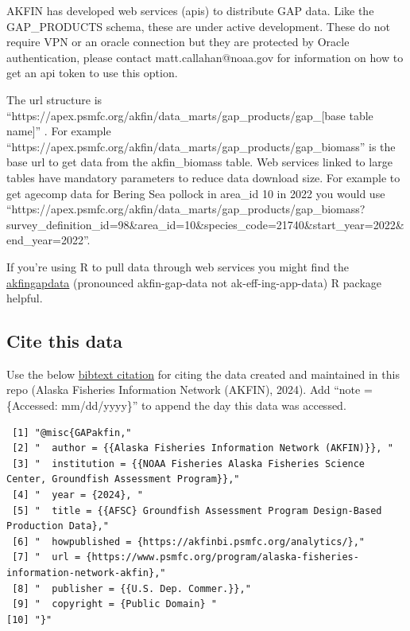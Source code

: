 \documentclass[
  letterpaper,
  oneside,
  open=any]{scrbook}
\begin{document}
AKFIN has developed web services (apis) to distribute GAP data. Like the
GAP\_PRODUCTS schema, these are under active development. These do not
require VPN or an oracle connection but they are protected by Oracle
authentication, please contact matt.callahan@noaa.gov for information on
how to get an api token to use this option.

The url structure is
``https://apex.psmfc.org/akfin/data\_marts/gap\_products/gap\_{[}base
table name{]}'' . For example
``https://apex.psmfc.org/akfin/data\_marts/gap\_products/gap\_biomass''
is the base url to get data from the akfin\_biomass table. Web services
linked to large tables have mandatory parameters to reduce data download
size. For example to get agecomp data for Bering Sea pollock in area\_id
10 in 2022 you would use
``https://apex.psmfc.org/akfin/data\_marts/gap\_products/gap\_biomass?survey\_definition\_id=98\&area\_id=10\&species\_code=21740\&start\_year=2022\&end\_year=2022''.

If you're using R to pull data through web services you might find the
\href{https://github.com/MattCallahan-NOAA/akfingapdata/tree/main}{akfingapdata}
(pronounced akfin-gap-data not ak-eff-ing-app-data) R package helpful.

\subsection*{Cite this data}\label{cite-this-data-2}

Use the below
\href{https://github.com/afsc-gap-products/gap_products/blob/main/content/references.bib}{bibtext
citation} for citing the data created and maintained in this repo
(Alaska Fisheries Information Network (AKFIN), 2024). Add ``note =
\{Accessed: mm/dd/yyyy\}'' to append the day this data was accessed.

\begin{verbatim}
 [1] "@misc{GAPakfin,"                                                                                   
 [2] "  author = {{Alaska Fisheries Information Network (AKFIN)}}, "                                     
 [3] "  institution = {{NOAA Fisheries Alaska Fisheries Science Center, Groundfish Assessment Program}},"
 [4] "  year = {2024}, "                                                                                 
 [5] "  title = {{AFSC} Groundfish Assessment Program Design-Based Production Data},"                    
 [6] "  howpublished = {https://akfinbi.psmfc.org/analytics/},"                                          
 [7] "  url = {https://www.psmfc.org/program/alaska-fisheries-information-network-akfin},"               
 [8] "  publisher = {{U.S. Dep. Commer.}},"                                                              
 [9] "  copyright = {Public Domain} "                                                                    
[10] "}"                                                                                                 
\end{verbatim}
\end{document}
